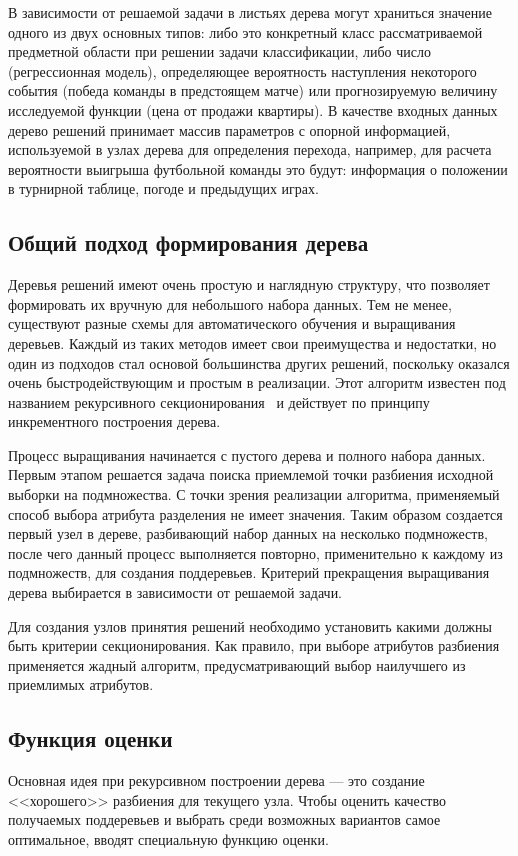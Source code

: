 \documentclass[a4paper,14pt]{extarticle} %
\begin{document}
В зависимости от решаемой задачи в листьях дерева могут храниться значение одного из двух основных типов: либо это конкретный класс рассматриваемой предметной области при решении задачи классификации, либо число (регрессионная модель), определяющее вероятность наступления некоторого события (победа команды в предстоящем матче) или прогнозируемую величину исследуемой функции (цена от продажи квартиры). В качестве входных данных дерево решений принимает массив параметров с опорной информацией, используемой в узлах дерева для определения перехода, например, для расчета вероятности выигрыша футбольной команды это будут: информация о положении в турнирной таблице, погоде и предыдущих играх.

\subsection{Общий подход формирования дерева}
\hspace{\parindent} Деревья решений имеют очень простую и наглядную структуру, что позволяет формировать их вручную для небольшого набора данных. Тем не менее, существуют разные схемы для автоматического обучения и выращивания деревьев. Каждый из таких методов имеет свои преимущества и недостатки, но один из подходов стал основой большинства других решений, поскольку оказался очень быстродействующим и простым в реализации. Этот алгоритм известен под названием рекурсивного секционирования~\cite{quinlan1990decision} и действует по принципу инкрементного построения дерева.

Процесс выращивания начинается с пустого дерева и полного набора данных. Первым этапом решается задача поиска приемлемой точки разбиения исходной выборки на подмножества. С точки зрения реализации алгоритма, применяемый способ выбора атрибута разделения не имеет значения. Таким образом создается первый узел в дереве, разбивающий набор данных на несколько подмножеств, после чего данный процесс выполняется повторно, применительно к каждому из подмножеств, для создания поддеревьев. Критерий прекращения выращивания дерева выбирается в зависимости от решаемой задачи.

Для создания узлов принятия решений необходимо установить какими должны быть критерии секционирования. Как правило, при выборе атрибутов разбиения применяется жадный алгоритм, предусматривающий выбор наилучшего из приемлимых атрибутов.

\subsection{Функция оценки}
\hspace{\parindent} Основная идея при рекурсивном построении дерева --- это создание <<хорошего>> разбиения для текущего узла. Чтобы оценить качество получаемых поддеревьев и выбрать среди возможных вариантов самое оптимальное, вводят специальную функцию оценки. 
\end{document}
